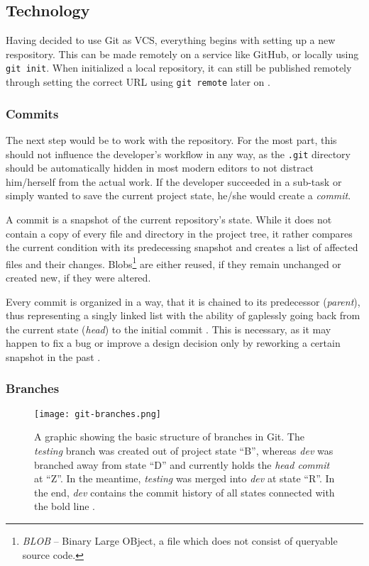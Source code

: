 
\subsection{Technology}
\label{sec:git-technology}
Having decided to use Git as VCS, everything begins with setting up a new respository. This can be made remotely on a service like GitHub, or locally using \texttt{git init}. When initialized a local repository, it can still be published remotely through setting the correct URL using \texttt{git remote} later on \cite[198]{loeliger2012version}.

\subsubsection{Commits}
The next step would be to work with the repository. For the most part, this should not influence the developer's workflow in any way, as the \texttt{.git} directory should be automatically hidden in most modern editors to not distract him/herself from the actual work. If the developer succeeded in a sub-task or simply wanted to save the current project state, he/she would create a \emph{commit}.

A commit is a snapshot of the current repository's state. While it does not contain a copy of every file and directory in the project tree, it rather compares the current condition with its predecessing snapshot and creates a list of affected files and their changes. Blobs\footnote{\emph{BLOB} -- Binary Large OBject, a file which does not consist of queryable source code.} are either reused, if they remain unchanged or created new, if they were altered\cite[65]{loeliger2012version}.

Every commit is organized in a way, that it is chained to its predecessor (\emph{parent}), thus representing a singly linked list with the ability of gaplessly going back from the current state (\emph{head}) to the initial commit \cite[204]{dhillon2016}\cite[65]{loeliger2012version}. This is necessary, as it may happen to fix a bug or improve a design decision only by reworking a certain snapshot in the past \cite[151]{loeliger2012version}.

\subsubsection{Branches}

\begin{figure} %
    \centering
    \texttt{[image: git-branches.png]}
    \caption{A graphic showing the basic structure of branches in Git. The \emph{testing} branch was created out of project state ``B'', whereas \emph{dev} was branched away from state ``D'' and currently holds the \emph{head commit} at ``Z''. In the meantime, \emph{testing} was merged into \emph{dev} at state ``R''. In the end, \emph{dev} contains the commit history of all states connected with the bold line \cite[p. 92f]{loeliger2012version}.}
    \label{fig:git-branches}
\end{figure}
%

